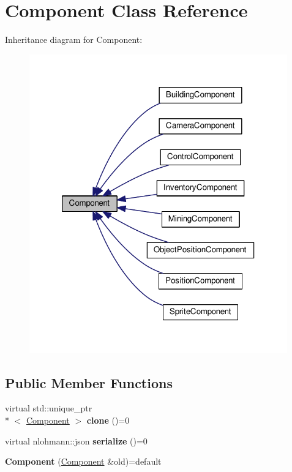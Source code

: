 \hypertarget{classComponent}{\section{Component Class Reference}
\label{classComponent}
}


Inheritance diagram for Component\-:
\nopagebreak
\begin{figure}[H]
\begin{center}
\leavevmode
\includegraphics[width=316pt]{classComponent__inherit__graph}
\end{center}
\end{figure}
\subsection*{Public Member Functions}
\begin{DoxyCompactItemize}
\item 
\hypertarget{classComponent_ab2be3d9a939ca73fa91d466be943fe69}{virtual std\-::unique\-\_\-ptr\\*
$<$ \hyperlink{classComponent}{Component} $>$ {\bfseries clone} ()=0}\label{classComponent_ab2be3d9a939ca73fa91d466be943fe69}

\item 
\hypertarget{classComponent_aff82f03afac28575d466fedd59219c3a}{virtual nlohmann\-::json {\bfseries serialize} ()=0}\label{classComponent_aff82f03afac28575d466fedd59219c3a}

\item 
\hypertarget{classComponent_a61a9c995bc0584eb210cf313107204c1}{{\bfseries Component} (\hyperlink{classComponent}{Component} \&old)=default}\label{classComponent_a61a9c995bc0584eb210cf313107204c1}

\end{DoxyCompactItemize}
